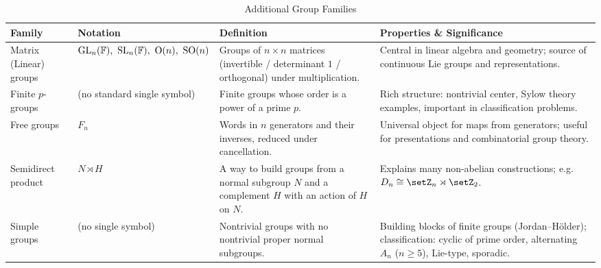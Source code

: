 \begin{table}[htbp]
  \centering
  \caption{Additional Group Families}
  \label{tab:more_groups}
  \renewcommand{\arraystretch}{1.4}
  \begin{tabularx}{\textwidth}{@{} l l X X @{}}
    \hline
    \textbf{Family} & \textbf{Notation} & \textbf{Definition} & \textbf{Properties \& Significance} \\
    \hline
    Matrix (Linear) groups & $\mathrm{GL}_n(\Bbb F),\ \mathrm{SL}_n(\Bbb F),\ \mathrm{O}(n),\ \mathrm{SO}(n)$
    & Groups of $n\times n$ matrices (invertible / determinant $1$ / orthogonal) under multiplication.
    & Central in linear algebra and geometry; source of continuous Lie groups and representations. \\
    \rule{0pt}{3ex}
    Finite $p$-groups & (no standard single symbol)
    & Finite groups whose order is a power of a prime $p$.
    & Rich structure: nontrivial center, Sylow theory examples, important in classification problems. \\
    \rule{0pt}{3ex}
    Free groups & $F_n$
    & Words in $n$ generators and their inverses, reduced under cancellation.
    & Universal object for maps from generators; useful for presentations and combinatorial group theory. \\
    \rule{0pt}{3ex}
    Semidirect product & $N\rtimes H$
    & A way to build groups from a normal subgroup $N$ and a complement $H$ with an action of $H$ on $N$.
    & Explains many non-abelian constructions; e.g. $D_n \cong \setZ_n\rtimes\setZ_2$. \\
    \rule{0pt}{3ex}
    Simple groups & (no single symbol)
    & Nontrivial groups with no nontrivial proper normal subgroups.
    & Building blocks of finite groups (Jordan–Hölder); classification: cyclic of prime order, alternating $A_n$ ($n\ge5$), Lie-type, sporadic. \\
    \hline
  \end{tabularx}
\end{table}


